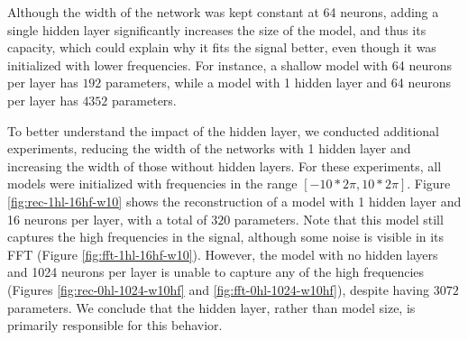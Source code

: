 Although the width of the network was kept constant at 64 neurons, adding a single hidden layer significantly increases the size of the model, and thus its capacity, which could explain why it fits the signal better, even though it was initialized with lower frequencies. For instance, a shallow model with 64 neurons per layer has $192$ parameters, while a model with 1 hidden layer and 64 neurons per layer has $4352$ parameters.



To better understand the impact of the hidden layer, we conducted additional experiments, reducing the width of the networks with 1 hidden layer and increasing the width of those without hidden layers. For these experiments, all models were initialized with frequencies in the range $[-10*2\pi, 10*2\pi]$. Figure \ref{fig:rec-1hl-16hf-w10} shows the reconstruction of a model with 1 hidden layer and 16 neurons per layer, with a total of $320$ parameters. Note that this model still captures the high frequencies in the signal, although some noise is visible in its FFT (Figure \ref{fig:fft-1hl-16hf-w10}). However, the model with no hidden layers and 1024 neurons per layer is unable to capture any of the high frequencies (Figures \ref{fig:rec-0hl-1024-w10hf} and \ref{fig:fft-0hl-1024-w10hf}), despite having $3072$ parameters. We conclude that the hidden layer, rather than model size, is primarily responsible for this behavior.

